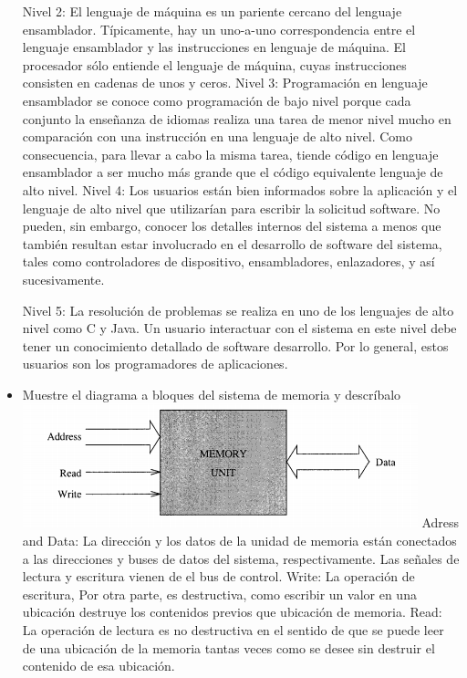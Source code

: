 \begin{itemize}
		   Nivel 2: El lenguaje de máquina es un pariente cercano del lenguaje ensamblador. Típicamente, hay un uno-a-uno correspondencia entre el lenguaje ensamblador y las instrucciones en lenguaje de máquina. El procesador
sólo entiende el lenguaje de máquina, cuyas instrucciones consisten en cadenas de unos y ceros.
		   Nivel 3: Programación en lenguaje ensamblador se conoce como programación de bajo nivel porque cada conjunto la enseñanza de idiomas realiza una tarea de menor nivel mucho en comparación con una instrucción en una
lenguaje de alto nivel. Como consecuencia, para llevar a cabo la misma tarea, tiende código en lenguaje ensamblador a ser mucho más grande que el código equivalente lenguaje de alto nivel.
		   Nivel 4: Los usuarios están bien informados sobre la aplicación y el lenguaje de alto nivel que utilizarían para escribir la solicitud software. No pueden, sin embargo, conocer los detalles internos del sistema a menos que también resultan estar involucrado en el desarrollo de software del sistema, tales como controladores de dispositivo, ensambladores, enlazadores, y así sucesivamente.
		   		   
		   Nivel 5: La resolución de problemas se realiza en uno de los lenguajes de alto nivel como C y
Java. Un usuario interactuar con el sistema en este nivel debe tener un conocimiento detallado de software
desarrollo. Por lo general, estos usuarios son los programadores de aplicaciones.
		
		\item Muestre el diagrama a bloques del sistema de memoria y descríbalo
		\includegraphics{imagenes/captura2.png}
		Adress and Data: La dirección y los datos de la unidad de memoria están conectados a las direcciones y buses de datos del sistema, respectivamente. Las señales de lectura y escritura vienen de el bus de control.
		Write: La operación de escritura,
Por otra parte, es destructiva, como escribir un valor en una ubicación destruye los contenidos previos que
ubicación de memoria.
		Read: La operación de lectura es no destructiva en el sentido de que se puede leer de una ubicación de la memoria
tantas veces como se desee sin destruir el contenido de esa ubicación.
		

\end{itemize}
